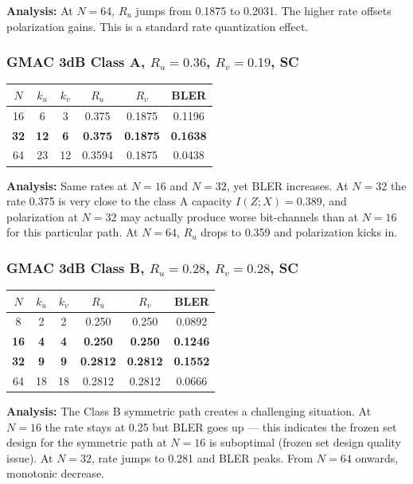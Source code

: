 \documentclass[11pt,a4paper]{article}
\newcommand{\up}[1]{\textcolor{upcolor}{\textbf{#1}}}
\begin{document}
\textbf{Analysis:} At $N=64$, $R_u$ jumps from 0.1875 to 0.2031. The higher rate offsets polarization gains. This is a standard rate quantization effect.

\subsubsection{GMAC 3dB Class A, $R_u=0.36$, $R_v=0.19$, SC}

\begin{tabular}{cccccc}
\toprule
$N$ & $k_u$ & $k_v$ & $R_u$ & $R_v$ & BLER \\
\midrule
16 & 6 & 3 & 0.375 & 0.1875 & 0.1196 \\
\textbf{32} & \textbf{12} & \textbf{6} & \textbf{0.375} & \textbf{0.1875} & \up{0.1638} \\
64 & 23 & 12 & 0.3594 & 0.1875 & 0.0438 \\
\bottomrule
\end{tabular}

\textbf{Analysis:} Same rates at $N=16$ and $N=32$, yet BLER increases. At $N=32$ the rate 0.375 is very close to the class A capacity $I(Z;X)=0.389$, and polarization at $N=32$ may actually produce worse bit-channels than at $N=16$ for this particular path. At $N=64$, $R_u$ drops to 0.359 and polarization kicks in.

\subsubsection{GMAC 3dB Class B, $R_u=0.28$, $R_v=0.28$, SC}

\begin{tabular}{cccccc}
\toprule
$N$ & $k_u$ & $k_v$ & $R_u$ & $R_v$ & BLER \\
\midrule
8 & 2 & 2 & 0.250 & 0.250 & 0.0892 \\
\textbf{16} & \textbf{4} & \textbf{4} & \textbf{0.250} & \textbf{0.250} & \up{0.1246} \\
\textbf{32} & \textbf{9} & \textbf{9} & \textbf{0.2812} & \textbf{0.2812} & \up{0.1552} \\
64 & 18 & 18 & 0.2812 & 0.2812 & 0.0666 \\
\bottomrule
\end{tabular}

\textbf{Analysis:} The Class B symmetric path creates a challenging situation. At $N=16$ the rate stays at 0.25 but BLER goes up — this indicates the frozen set design for the symmetric path at $N=16$ is suboptimal (frozen set design quality issue). At $N=32$, rate jumps to 0.281 and BLER peaks. From $N=64$ onwards, monotonic decrease.
\end{document}
